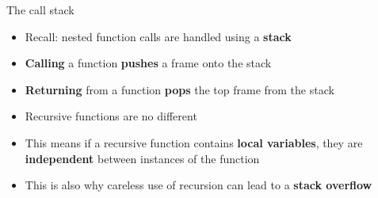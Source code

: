 \begin{frame}{The call stack}
	\begin{itemize}
        \pause\item Recall: nested function calls are handled using a \textbf{stack}
        \pause\item \textbf{Calling} a function \textbf{pushes} a frame onto the stack
        \pause\item \textbf{Returning} from a function \textbf{pops} the top frame from the stack
		\pause\item Recursive functions are no different
		\pause\item This means if a recursive function contains \textbf{local variables},
            they are \textbf{independent} between instances of the function
        \pause\item This is also why careless use of recursion can lead to a \textbf{stack overflow}
	\end{itemize}
\end{frame}
